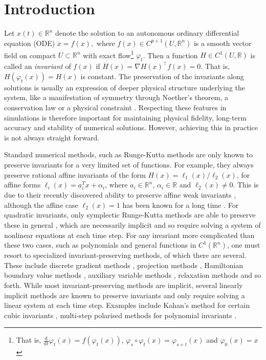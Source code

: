 \documentclass[final,3p,times]{elsarticle}
\newcommand{\R}{\mathbb{R}}
\newcommand{\rd}{\mathrm{d}}
\begin{document}
\section{Introduction}
Let $x(t)\in\mathbb{R}^n$ denote the solution to an autonomous ordinary differential equation (ODE) $\dot{x} = f(x),$
where $f(x)\in C^{p+1}(U,\R^{n})$ is a smooth vector field on compact $U\subset\R^{n}$ with exact flow\footnote{That is, $\frac{\rd}{\rd t}\varphi_t(x)=f(\varphi_t(x))$, $\varphi_s\circ\varphi_t(x)=\varphi_{s+t}(x)$ and $\varphi_0(x)=x$} $\varphi_t$. Then a function $H\in C^{1}(U,\R)$ is called an \emph{invariant} of $f(x)$ if $\dot{H}(x)=\nabla H(x)^\top f(x)=0$. That is, $H(\varphi_t(x))=H(x)$ is constant. The preservation of the invariants along solutions is usually an expression of deeper physical structure underlying the system, like a manifestation of symmetry through Noether's theorem, a conservation law or a physical constraint \cite{hairer2006geometric}. Respecting these features in simulations is therefore important for maintaining physical fidelity, long-term accuracy and stability of numerical solutions. However, achieving this in practice is not always straight forward. 

Standard numerical methods, such as Runge-Kutta methods are only known to preserve invariants for a very limited set of functions. For example, they always preserve rational affine invariants of the form $H(x)=\ell_1(x)/\ell_2(x)$, for affine forms $\ell_i(x)=a_i^Tx+\alpha_i$, where $a_i\in\R^n$, $\alpha_i\in\R$ and $\ell_2(x)\ne 0$. This is due to their recently discovered ability to preserve affine weak invariants \cite{tapley2023preservation}, although the affine case $\ell_2(x)=1$ has been known for a long time \cite{hairer1987solving}. For quadratic invariants, only symplectic Runge-Kutta methods are able to preserve these in general \cite{cooper1987stability, sanz2018numerical}, which are necessarily implicit and so require solving a system of nonlinear equations at each time step. For any invariant more complicated than these two cases, such as polynomials and general functions in $C^1(\R^n)$, one must resort to specialized invariant-preserving methods, of which there are several. These include discrete gradient methods \cite{mclachlan1999geometric}, projection methods \cite{norton2015discrete}, Hamiltonian boundary value methods \cite{brugnano2010hamiltonian}, auxiliary variable methods \cite{tapley2022geometric}, relaxation methods \cite{ketcheson2019relaxation, biswas2023multiple} and so forth. While most invariant-preserving methods are implicit, several linearly implicit methods are known to preserve invariants and only require solving a linear system at each time step. Examples include Kahan's method for certain cubic invariants \cite{celledoni2012geometric}, multi-step polarised methods for polynomial invariants \cite{celledoni2015discretization}. 
\end{document}
